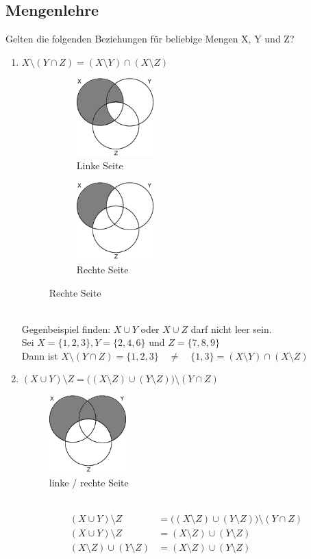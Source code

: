 \documentclass[11pt, a4paper]{article}
\begin{document}
\subsection{Mengenlehre}
Gelten die folgenden Beziehungen für beliebige Mengen X, Y und Z?
\begin{enumerate}
	\item $X \setminus (Y \cap Z) = (X \setminus Y) \cap (X \setminus Z)$
	\begin{figure}[h!]
		\centering
		\begin{subfigure}{3cm}
			\includegraphics[height=3cm]{MengenlehreAufgabe1a}
			\caption{Linke Seite}
		\end{subfigure}
		\begin{subfigure}{3cm}
			\includegraphics[height=3cm]{MengenlehreAufgabe1b}
			\caption{Rechte Seite}
		\end{subfigure}
	\end{figure} \\
	Gegenbeispiel finden: $X \cup Y$ oder $X \cup Z$ darf nicht leer sein. \\
	Sei $X = \{1,2,3\}, Y = \{2,4,6\}$ und $Z = \{7,8,9\}$ \\
	Dann ist $X \setminus (Y \cap Z) = \{1,2,3\} \quad \neq \quad \{1,3\} = (X \setminus Y) \cap (X \setminus Z)$
	\item $(X \cup Y) \setminus Z = \big((X \setminus Z) \cup (Y \setminus Z)\big) \setminus (Y \cap Z)$
	\begin{figure}[h!]
		\centering
		\includegraphics[height=3cm]{MengenlehreAufgabe2}
		\caption{linke / rechte Seite}
	\end{figure} \\
	\begin{align*}
		(X \cup Y) \setminus Z &= \big((X \setminus Z) \cup (Y \setminus Z)\big) \setminus (Y \cap Z) \\
		(X \cup Y) \setminus Z &= (X \setminus Z) \cup (Y \setminus Z) \\
		(X \setminus Z) \cup (Y \setminus Z) &= (X \setminus Z) \cup (Y \setminus Z)
	\end{align*}
\end{enumerate}
\end{document}
